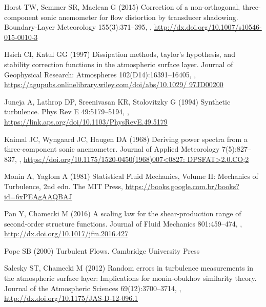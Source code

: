 \documentclass{svjour3}                     %
\begin{document}
\begin{thebibliography}{26}
Horst TW, Semmer SR, Maclean G (2015) Correction of a non-orthogonal,
  three-component sonic anemometer for flow distortion by transducer shadowing.
  Boundary-Layer Meteorology 155(3):371--395, ,
  \urlprefix\url{http://dx.doi.org/10.1007/s10546-015-0010-3}

Hsieh CI, Katul GG (1997) Dissipation methods, taylor's hypothesis, and
  stability correction functions in the atmospheric surface layer. Journal of
  Geophysical Research: Atmospheres 102(D14):16391--16405,
  ,
  \urlprefix\url{https://agupubs.onlinelibrary.wiley.com/doi/abs/10.1029/
  97JD00200}

Juneja A, Lathrop DP, Sreenivasan KR, Stolovitzky G (1994) Synthetic
  turbulence. Phys Rev E 49:5179--5194, ,
  \urlprefix\url{https://link.aps.org/doi/10.1103/PhysRevE.49.5179}

Kaimal JC, Wyngaard JC, Haugen DA (1968) Deriving power spectra from a
  three-component sonic anemometer. Journal of Applied Meteorology
  7(5):827--837, ,
  \urlprefix\url{https://doi.org/10.1175/1520-0450(1968)007<0827:
  DPSFAT>2.0.CO;2}

Monin A, Yaglom A (1981) Statistical Fluid Mechanics, Volume II: Mechanics of
  Turbulence, 2nd edn. The MIT Press,
  \urlprefix\url{https://books.google.com.br/books?id=6xPEAgAAQBAJ}

Pan Y, Chamecki M (2016) A scaling law for the shear-production range of
  second-order structure functions. Journal of Fluid Mechanics 801:459--474,
  ,
  \urlprefix\url{http://dx.doi.org/10.1017/jfm.2016.427}

Pope SB (2000) Turbulent Flows. Cambridge University Press

Salesky ST, Chamecki M (2012) Random errors in turbulence measurements in the
  atmospheric surface layer: Implications for monin-obukhov similarity theory.
  Journal of the Atmospheric Sciences 69(12):3700--3714,
  ,
  \urlprefix\url{http://dx.doi.org/10.1175/JAS-D-12-096.1}


\end{thebibliography}
\end{document}
